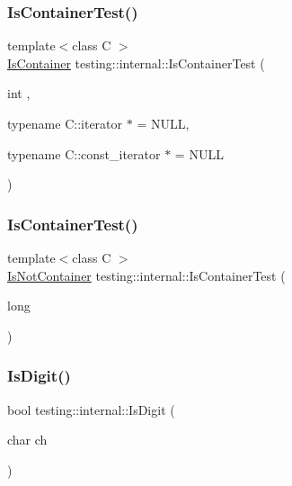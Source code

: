 \subsubsection{\texorpdfstring{Is\+Container\+Test()}{IsContainerTest()}\hspace{0.1cm}{\footnotesize\ttfamily [1/2]}}
{\footnotesize\ttfamily template$<$class C $>$ \\
\hyperlink{namespacetesting_1_1internal_ad8f0c2883245f1df2a53618a49f0deb3}{Is\+Container} testing\+::internal\+::\+Is\+Container\+Test (\begin{DoxyParamCaption}\item[{int}]{,  }\item[{typename C\+::iterator $\ast$}]{ = {\ttfamily NULL},  }\item[{typename C\+::const\+\_\+iterator $\ast$}]{ = {\ttfamily NULL} }\end{DoxyParamCaption})}

\mbox{\label{namespacetesting_1_1internal_af545a2ae928b8a9e7581978234464275}} 
\subsubsection{\texorpdfstring{Is\+Container\+Test()}{IsContainerTest()}\hspace{0.1cm}{\footnotesize\ttfamily [2/2]}}
{\footnotesize\ttfamily template$<$class C $>$ \\
\hyperlink{namespacetesting_1_1internal_abf080521ce135deb510e0a7830fd3d33}{Is\+Not\+Container} testing\+::internal\+::\+Is\+Container\+Test (\begin{DoxyParamCaption}\item[{long}]{ }\end{DoxyParamCaption})}

\mbox{\label{namespacetesting_1_1internal_a4bd96b7fa6486802d33ddc217af55a39}} 
\subsubsection{\texorpdfstring{Is\+Digit()}{IsDigit()}}
{\footnotesize\ttfamily bool testing\+::internal\+::\+Is\+Digit (\begin{DoxyParamCaption}\item[{char}]{ch }\end{DoxyParamCaption})\hspace{0.3cm}{\ttfamily [inline]}}

